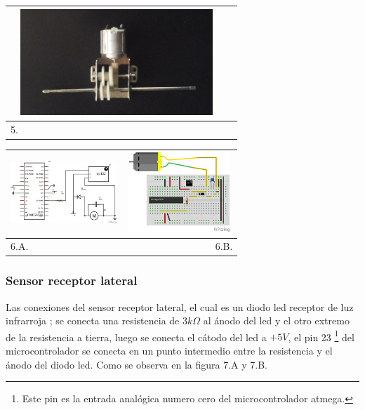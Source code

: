 \documentclass[12]{article}
\newenvironment{Figure}
{\par\medskip\noindent\minipage{\linewidth}}
{\endminipage\par\medskip}
\begin{document}
\begin{multicols}{2}
\begin{Figure}
\center
\begin{tabular}{|l|r|}
\hline
\includegraphics[width=8cm, height=4cm]{img/transmision.png}  \\ \hline
5. \\ \hline
\end{tabular}
\label{fig:g5}
\end{Figure}

\begin{Figure}
\center
\begin{tabular}{|l|r|}
\hline
\includegraphics[width=4cm, height=3cm]{img/esquemamotor.png} & \includegraphics[width=4cm, height=3cm]{img/montajemot.png} \\ \hline
6.A. & 6.B. \\ \hline
\end{tabular}
\label{fig:g6}
\end{Figure}

\subsubsection{Sensor receptor lateral}
Las conexiones del sensor receptor lateral, el cual es un diodo led receptor de luz infrarroja \cite{INFRARED}; se conecta una resistencia de $3 k\Omega$ al ánodo del led y el otro extremo de la resistencia a tierra, luego se conecta el cátodo del led a $+5V$, el pin 23 \footnote{Este pin es la entrada analógica numero cero del microcontrolador atmega.} del microcontrolador se conecta  en un punto intermedio entre la resistencia y el ánodo del diodo led. Como se observa en la figura 7.A y 7.B.


\end{multicols}
\end{document}
